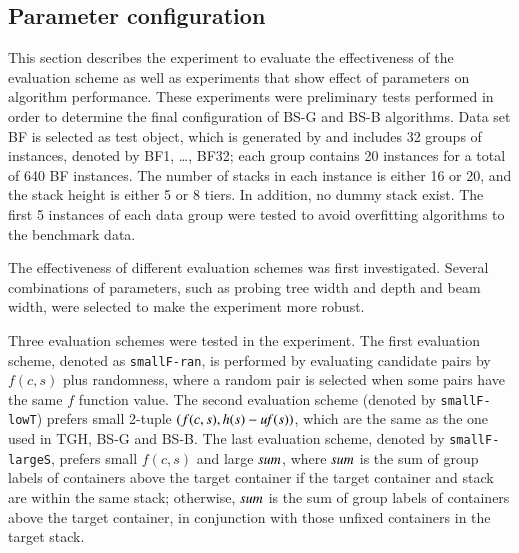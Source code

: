 \documentclass[review,3p,times,authoryear,12pt]{elsarticle}
\begin{document}
\subsection {Parameter configuration}
\label{sub:config}

This section describes the experiment to evaluate the effectiveness of the evaluation scheme as well as experiments that show effect of parameters on algorithm performance. These experiments were preliminary tests performed in order to determine the final configuration of BS-G and BS-B algorithms. Data set BF is selected as test object, which is generated by \cite{BF2012} and includes 32 groups of instances, denoted by BF1, \dots, BF32; each group contains 20 instances for a total of 640 BF instances. The number of stacks in each instance is either 16 or 20, and the stack height is either 5 or 8 tiers. In addition, no dummy stack exist. The first 5 instances of each data group were tested to avoid overfitting algorithms to the benchmark data.

The effectiveness of different evaluation schemes was first investigated. Several combinations of parameters, such as probing tree width and depth and beam width, were selected to make the experiment more robust.

Three evaluation schemes were tested in the experiment. The first evaluation scheme, denoted as \texttt{smallF-ran}, is performed by evaluating candidate pairs by $f(c,s)$ plus randomness, where a random pair is selected when some pairs have the same $f$ function value. The second evaluation scheme (denoted by \texttt{smallF-lowT}) prefers small 2-tuple $(f(c,s),h(s)-\id{uf}(s))$, which are the same as the one used in TGH, BS-G and BS-B. The last evaluation scheme, denoted by \texttt{smallF-largeS}, prefers small $f(c,s)$ and large $\id{sum}$, where $\id{sum}$ is the sum of group labels of containers above the target container if the target container and stack are within the same stack; otherwise, $\id{sum}$ is the sum of group labels of containers above the target container, in conjunction with those unfixed containers in the target stack.
\end{document}
